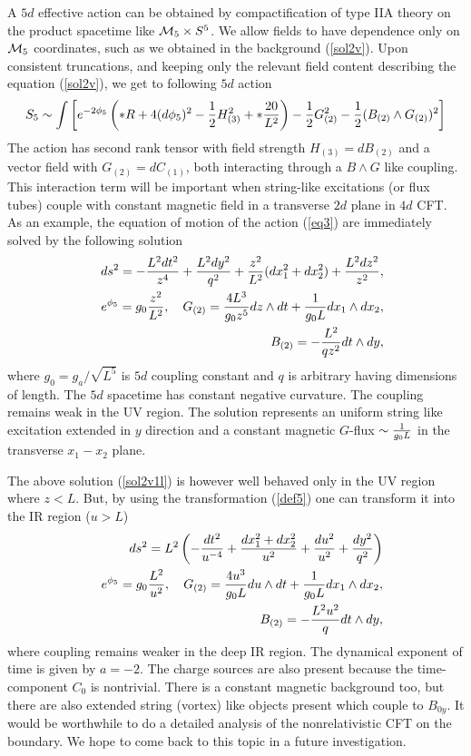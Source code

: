 \documentclass[12pt]{article}
\def\bea{\begin{eqnarray}} \def\eea{\end{eqnarray}} \def\ba{\begin{array}}
\newcommand{\eqn}[1]{(\ref{#1})}
\def\br{\nonumber\\}
\begin{document}
A $5d$ effective action can be obtained by compactification 
of  type IIA theory on  the product spacetime  like
 ${\cal M}_5\times S^5$. We 
allow  fields to have dependence only on ${\cal M}_5$ coordinates,
such as we obtained in the  background  \eqn{sol2v}.
Upon consistent truncations,  and keeping only the  relevant field
content describing the equation \eqn{sol2v}, we  get to  following 
$5d$   action 
\bea\label{eq3}
S_{5}\sim \int \bigg[ e^{-2\phi_5}\left( \ast R +4(d\phi_5)^2
-{1\over 2}H_{(3)}^2 +\ast {20\over L^2}\right)  
-{1\over 2} G_{(2)}^2 - {1\over 2} (B_{(2)}\wedge G_{(2)})^2  
\bigg] \br 
\eea
The action has  second rank tensor with field strength
$H_{(3)}=dB_{(2)}$ and a vector field with 
$G_{(2)}=dC_{(1)}$, both interacting through a
 $B\wedge G$ like coupling. This interaction 
term will be important when  string-like
excitations (or flux tubes) 
couple with constant magnetic field in a transverse $2d$ plane
in  $4d$ CFT. As an example,
the equation of motion of the action \eqn{eq3}
are immediately solved by the following  solution
\bea\label{sol2v1l}
&&ds^2=- {L^2 dt^2\over  z^4}+{L^2 dy^2\over q^2 } +{z^2\over L^2}(dx_1^2+dx_2^2)+{L^2 dz^2\over
z^2} ,\br
&&e^{\phi_5}= g_0{z^2\over L^2} , ~~~
G_{(2)}= {4L^3\over g_0 z^5} dz\wedge dt + {1\over g_0L} dx_1\wedge dx_2 ,
\br&&~~~~ B_{(2)}=  -{L^2\over q z^2}dt\wedge dy, 
\eea 
where $g_0=g_a/ \sqrt{L^5}$ is $5d$ coupling constant and $q$ is 
arbitrary  having dimensions of length. The $5d$ spacetime 
has constant negative curvature. 
The  coupling remains weak
in the UV region. The solution represents an uniform string like
excitation  extended in 
$y$ direction and a constant magnetic $G$-flux $\sim  {1\over g_0L}$
 in the transverse $x_1-x_2$ plane. 


The above solution \eqn{sol2v1l} is however  well behaved
only in the UV region where $z<L$.
But, by using the transformation \eqn{def5} one can transform it
into the IR region ($u>L$)
\bea\label{sol2v2l}
&&ds^2=L^2\left(- {dt^2\over  u^{-4}}
+{dx_1^2+dx_2^2 \over u^2}+{ du^2\over u^2} +{ dy^2\over q^2 } 
\right)\br
&&e^{\phi_5}= g_0{L^2\over u^2} , ~~~
G_{(2)}= {4u^3\over g_0 L} du\wedge dt + {1\over g_0L} dx_1\wedge dx_2 ,
\br&&~~~~ B_{(2)}=  -{L^2u^2\over q }dt\wedge dy, 
\eea 
where coupling remains weaker in the deep IR region. 
The dynamical exponent of time is given by $a=-2$. The charge
sources are also  present because the time-component $C_0$
is nontrivial. There is a constant magnetic background too, but
there are also extended string  (vortex) like objects present which couple to
 $B_{0y}$. It would be worthwhile to do a detailed analysis 
of the  nonrelativistic
CFT on the boundary. We hope to come back to this topic
in a future investigation.
\end{document}
